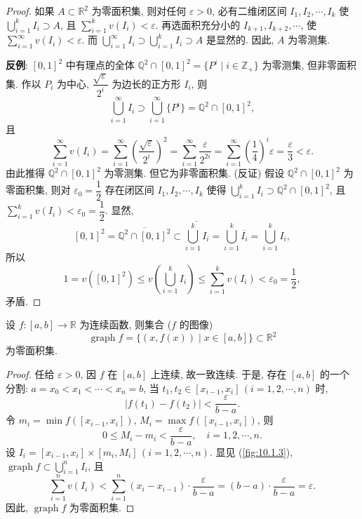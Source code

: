 \begin{proof}
如果 $A \subset \mathbb{R}^{2}$ 为零面积集, 则对任何 $\varepsilon > 0$, 必有二维闭区间 $I_{1}, I_{2}, \cdots, I_{k}$ 使 $\bigcup\limits_{i=1}^{k} I_{i} \supset A$, 且 $\sum\limits_{i=1}^{k} v(I_{i}) < \varepsilon$. 再选面积充分小的 $I_{k+1}, I_{k+2}, \cdots$, 使 $\sum\limits_{i=1}^{\infty} v(I_{i}) < \varepsilon$. 而 $\bigcup\limits_{i=1}^{\infty} I_{i} \supset \bigcup\limits_{i=1}^{k} I_{i} \supset A$ 是显然的. 因此, $A$ 为零测集.

\textbf{反例}: $[0, 1]^{2}$ 中有理点的全体 $\mathbb{Q}^{2} \cap [0, 1]^{2} = \{P^{i} \mid i \in \mathbb{Z}_{+}\}$ 为零测集, 但非零面积集. 作以 $P_i$ 为中心, $\dfrac{\sqrt{\varepsilon}}{2^i}$ 为边长的正方形 $I_i$, 则
\[
  \bigcup_{i=1}^{\infty} I_i \supset \bigcup_{i=1}^{\infty} \{P^i\} = \mathbb{Q}^{2} \cap [0, 1]^{2},
\]
且
\[
  \sum_{i=1}^{\infty} v(I_i) = \sum_{i=1}^{\infty} \left(\frac{\sqrt{\varepsilon}}{2^i}\right)^2 = \sum_{i=1}^{\infty} \frac{\varepsilon}{2^{2i}} = \sum_{i=1}^{\infty} \left(\frac{1}{4}\right)^i \varepsilon = \frac{\varepsilon}{3} < \varepsilon.
\]
由此推得 $\mathbb{Q}^{2} \cap [0, 1]^{2}$ 为零测集. 但它为非零面积集. (反证) 假设 $\mathbb{Q}^{2} \cap [0, 1]^{2}$ 为零面积集, 则对 $\varepsilon_0 = \dfrac{1}{2}$ 存在闭区间 $I_1, I_2, \cdots, I_k$ 使得 $\bigcup\limits_{i=1}^{k} I_i \supset \mathbb{Q}^{2} \cap [0, 1]^{2}$, 且 $\sum\limits_{i=1}^{k} v(I_i) < \varepsilon_0 = \dfrac{1}{2}$. 显然,
\[
  [0, 1]^{2} = \overline{\mathbb{Q}^{2} \cap [0, 1]^{2}} \subset \overline{\bigcup_{i=1}^{k} I_i} = \bigcup_{i=1}^{k} \overline{I_i} = \bigcup_{i=1}^{k} I_i,
\]
所以
\[
  1 = v([0, 1]^{2}) \leqslant v\left(\bigcup_{i=1}^{k} I_i\right) \leqslant \sum_{i=1}^{k} v(I_i) < \varepsilon_0 = \frac{1}{2},
\]
矛盾.
\end{proof}

\begin{example}\label{ex:10.1.1}
设 $f\colon [a, b] \to \mathbb{R}$ 为连续函数, 则集合 ($f$ 的图像)
\[
  \operatorname{graph} f = \{(x, f(x)) \mid x \in [a, b]\} \subset \mathbb{R}^{2}
\]
为零面积集.
\end{example}

\begin{proof}
任给 $\varepsilon > 0$, 因 $f$ 在 $[a, b]$ 上连续, 故一致连续. 于是, 存在 $[a, b]$ 的一个分割: $a = x_{0} < x_{1} < \cdots < x_{n} = b$, 当 $t_{1}, t_{2} \in [x_{i-1}, x_{i}]\, (i = 1, 2, \cdots, n)$ 时,
\[
  |f(t_{1}) - f(t_{2})| < \frac{\varepsilon}{b - a}.
\]
令 $m_{i} = \min f([x_{i-1}, x_{i}])$, $M_{i} = \max f([x_{i-1}, x_{i}])$, 则
\[
  0 \leqslant M_{i} - m_{i} < \frac{\varepsilon}{b - a}, \quad i = 1, 2, \cdots, n.
\]
设 $I_{i} = [x_{i-1}, x_{i}] \times [m_{i}, M_{i}]\, (i = 1, 2, \cdots, n)$. 显见 (\cref{fig:10.1.3}), $\operatorname{graph} f \subset \bigcup\limits_{i=1}^{n} I_{i}$, 且
\[
  \sum_{i=1}^{n} v(I_{i}) < \sum_{i=1}^{n}(x_{i} - x_{i-1}) \cdot \frac{\varepsilon}{b - a} = (b - a) \cdot \frac{\varepsilon}{b - a} = \varepsilon.
\]
因此, $\operatorname{graph} f$ 为零面积集.
\end{proof}

